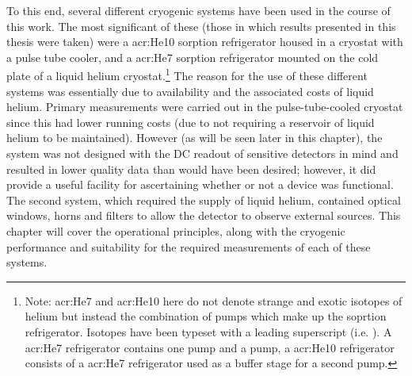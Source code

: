 To this end, several different cryogenic systems have been used in the course of this work. The most significant of these (those in which results presented in this thesis were taken) were a \gls{acr:He10} sorption refrigerator housed in a cryostat with a pulse tube cooler, and a \gls{acr:He7} sorption refrigerator mounted on the cold plate of a liquid helium cryostat.\footnote{Note: \gls{acr:He7} and \gls{acr:He10} here do not denote strange and exotic isotopes of helium but instead the combination of pumps which make up the soprtion refrigerator. Isotopes have been typeset with a leading superscript (i.e. ). A \gls{acr:He7} refrigerator contains one  pump and a  pump, a \gls{acr:He10} refrigerator consists of a \gls{acr:He7} refrigerator used as a buffer stage for a second  pump.} The reason for the use of these different systems was essentially due to availability and the associated costs of liquid helium. Primary measurements were carried out in the pulse-tube-cooled cryostat since this had lower running costs (due to not requiring a reservoir of liquid helium to be maintained). However (as will be seen later in this chapter), the system was not designed with the DC readout of sensitive detectors in mind and resulted in lower quality data than would have been desired; however, it did provide a useful facility for ascertaining whether or not a device was functional. The second system, which required the supply of liquid helium, contained optical windows, horns and filters to allow the detector to observe external sources. This chapter will cover the operational principles, along with the cryogenic performance and suitability for the required measurements of each of these systems.
%
